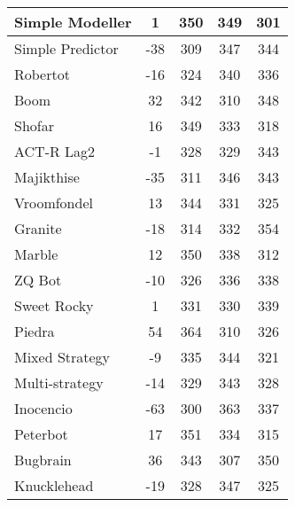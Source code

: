 \begin{table}
\begin{tabular}{|l|c|c|c|c|}
Simple Modeller & 1 & 350 & 349 & 301 \\ \hline 
Simple Predictor & -38 & 309 & 347 & 344 \\ \hline 
Robertot & -16 & 324 & 340 & 336 \\ \hline 
Boom & 32 & 342 & 310 & 348 \\ \hline 
Shofar & 16 & 349 & 333 & 318 \\ \hline 
ACT-R Lag2 & -1 & 328 & 329 & 343 \\ \hline 
Majikthise & -35 & 311 & 346 & 343 \\ \hline 
Vroomfondel & 13 & 344 & 331 & 325 \\ \hline 
Granite & -18 & 314 & 332 & 354 \\ \hline 
Marble & 12 & 350 & 338 & 312 \\ \hline 
ZQ Bot & -10 & 326 & 336 & 338 \\ \hline 
Sweet Rocky & 1 & 331 & 330 & 339 \\ \hline 
\rowcolor{HighlightRowColor} Piedra & 54 & 364 & 310 & 326 \\ \hline 
Mixed Strategy & -9 & 335 & 344 & 321 \\ \hline 
Multi-strategy & -14 & 329 & 343 & 328 \\ \hline 
Inocencio & -63 & 300 & 363 & 337 \\ \hline 
Peterbot & 17 & 351 & 334 & 315 \\ \hline 
Bugbrain & 36 & 343 & 307 & 350 \\ \hline 
Knucklehead & -19 & 328 & 347 & 325 \\ \hline
        \end{tabular}
    \end{table}